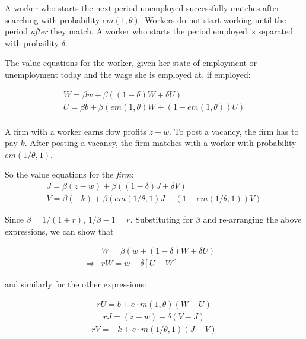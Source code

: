 \documentclass[12pt]{article}
\begin{document}
A worker who starts the next period unemployed successfully matches after searching with probability $em(1,\theta)$. Workers do not start working until the period \textit{after} they match.  A worker who starts the period employed is separated with probaility $\delta$.  

The value equations for the worker, given her state of employment or unemployment today and the wage she is employed at, if employed:

\begin{eqnarray*}
	W = \beta w + \beta ((1-\delta) W + \delta U ) \\
	U = \beta b + \beta ( em(1,\theta) W + (1- em(1,\theta)) U)  \\
\end{eqnarray*}



A firm with a worker earns flow profits $z - w$.  To post a vacancy, the firm has to pay $k$.  After posting a vacancy, the firm matches with a worker with probability $em(1/\theta,1)$. 

So the value equations for the \textit{firm}:
\begin{eqnarray*}
J = \beta (z - w) + \beta ((1-\delta) J + \delta V)  \\
V = \beta (-k) + \beta (em(1/\theta,1) J + (1- em(1/\theta,1)) V)  
\end{eqnarray*}


% 


Since $\beta = 1/(1+r)$,  $1/\beta - 1 = r$.  Substituting for $\beta$ and re-arranging the above expressions, we can show that

\begin{equation}\label{eq:W}
	\begin{aligned}
		&W = \beta(w + (1-\delta) W  + \delta U ) & \\ \Rightarrow & r W = w + \delta [U - W]&
	\end{aligned}
\end{equation}

and similarly for the other expressions:


\begin{equation}\label{eq:U}
	\begin{aligned}
		r U  = b + e \cdot m(1, \theta) (W - U) 
	\end{aligned}
\end{equation}
\begin{equation}\label{eq:J}
	\begin{aligned}
		r J = (z - w) + \delta (V - J)
	\end{aligned}
\end{equation}
\begin{equation}\label{eq:V}
	\begin{aligned}
		r V = - k + e \cdot m(1/\theta, 1) (J - V)
	\end{aligned}
\end{equation}
\end{document}
